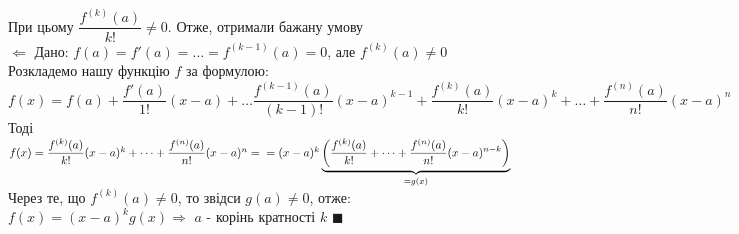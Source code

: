 \documentclass[a4paper, 14pt]{extarticle}
\def\bigline{\vspace{5mm}\\}
\def\qed{$\blacksquare$}
\begin{document}
При цьому $\dfrac{f^{(k)}(a)}{k!} \neq 0$. Отже, отримали бажану умову
\bigline
$\boxed{\Leftarrow}$ Дано: $f(a)=f'(a)=\dots=f^{(k-1)}(a) =0$, але $f^{(k)}(a) \neq 0$\\
Розкладемо нашу функцію $f$ за формулою:\\
$f(x) = f(a) + \dfrac{f'(a)}{1!}(x-a) + \dots \dfrac{f^{(k-1)}(a)}{(k-1)!}(x-a)^{k-1} + \dfrac{f^{(k)}(a)}{k!}(x-a)^{k} + \dots + \dfrac{f^{(n)}(a)}{n!}(x-a)^n$\\
Тоді\\
$f(x) = \dfrac{f^{(k)}(a)}{k!}(x-a)^{k} + \dots + \dfrac{f^{(n)}(a)}{n!}(x-a)^n = \\ = (x-a)^k \underbrace{\left(\dfrac{f^{(k)}(a)}{k!} + \dots + \dfrac{f^{(n)}(a)}{n!}(x-a)^{n-k} \right)}_{=g(x)}$\\
Через те, що $f^{(k)}(a) \neq 0$, то звідси $g(a) \neq 0$, отже:\\
$f(x) = (x-a)^k g(x) \Rightarrow$ $a$ - корінь кратності $k$ \qed
\bigline
\end{document}
